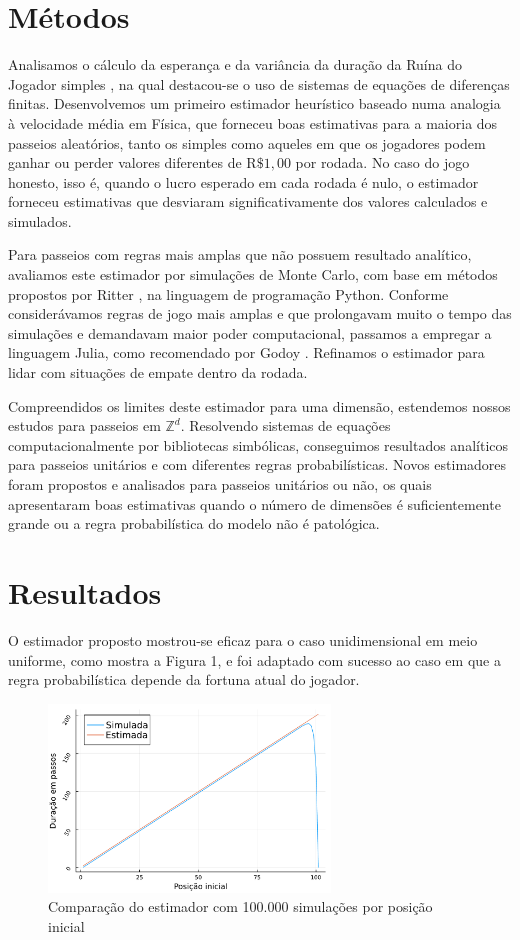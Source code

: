 \documentclass[a4paper,10pt,twocolumn]{article}
\begin{document}
\section{Métodos}

Analisamos o cálculo da esperança e da variância da duração da Ruína do Jogador
simples \cite{andel_variance_2012}, na qual destacou-se o uso de sistemas de
equações de diferenças finitas. Desenvolvemos um primeiro estimador heurístico
baseado numa analogia à velocidade média em Física, que forneceu boas
estimativas  para a maioria dos passeios aleatórios, tanto os simples como
aqueles em que os jogadores podem ganhar ou perder valores diferentes de
$\mathrm{R}\$1,00$ por rodada. No caso do jogo honesto, isso é, quando o lucro
esperado em cada rodada é nulo, o estimador forneceu estimativas que desviaram
significativamente dos valores calculados e simulados.

Para passeios com regras mais amplas que não possuem resultado analítico,
avaliamos este estimador por simulações de Monte Carlo, com base em métodos
propostos por Ritter \cite{ritter_determining_2011}, na linguagem de programação
Python. Conforme considerávamos regras de jogo mais amplas e que prolongavam
muito o tempo das simulações e demandavam maior poder computacional, passamos a
empregar a linguagem Julia, como recomendado por Godoy
\cite{godoy_evaluating_2023}. Refinamos o estimador para lidar com situações de
empate dentro da rodada.

Compreendidos os limites deste estimador para uma dimensão, estendemos nossos
estudos para passeios em $\mathbb{Z}^d$. Resolvendo sistemas de equações
computacionalmente por bibliotecas simbólicas, conseguimos resultados analíticos
para passeios unitários e com diferentes regras probabilísticas. Novos
estimadores foram propostos e analisados para passeios unitários ou não, os
quais apresentaram boas estimativas quando o número de dimensões é
suficientemente grande ou a regra probabilística do modelo não é patológica.

\section{Resultados}

O estimador proposto mostrou-se eficaz para o caso unidimensional em meio
uniforme, como mostra a Figura 1, e foi adaptado com sucesso ao caso em que a
regra probabilística depende da fortuna atual do jogador.

\begin{figure}[H]
    \centering
    \includegraphics[width=7.5cm]{"graficoest.pdf"}
    \centering
    \caption{Comparação do estimador com 100.000 simulações por posição inicial}
\end{figure}
\end{document}
